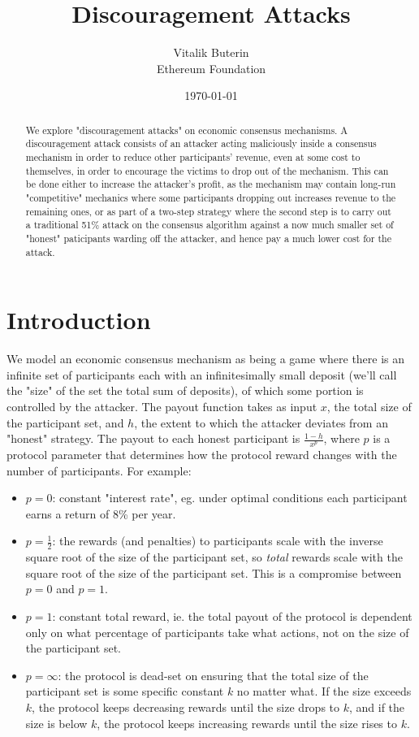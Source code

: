 \documentclass[12pt]{article}
\title{Discouragement Attacks}
\author{
        Vitalik Buterin \\
        Ethereum Foundation
}
\date{\today}
\begin{document}
\maketitle
\begin{abstract}
We explore "discouragement attacks" on economic consensus mechanisms. A discouragement attack consists of an attacker acting maliciously inside a consensus mechanism in order to reduce other participants' revenue, even at some cost to themselves, in order to encourage the victims to drop out of the mechanism. This can be done either to increase the attacker's profit, as the mechanism may contain long-run "competitive" mechanics where some participants dropping out increases revenue to the remaining ones, or as part of a two-step strategy where the second step is to carry out a traditional 51\% attack on the consensus algorithm against a now much smaller set of "honest" paticipants warding off the attacker, and hence pay a much lower cost for the attack.
\end{abstract}

\section{Introduction}
We model an economic consensus mechanism as being a game where there is an infinite set of participants each with an infinitesimally small deposit (we'll call the "size" of the set the total sum of deposits), of which some portion is controlled by the attacker. The payout function takes as input $x$, the total size of the participant set, and $h$, the extent to which the attacker deviates from an "honest" strategy. The payout to each honest participant is $\frac{1-h}{x^p}$, where $p$ is a protocol parameter that determines how the protocol reward changes with the number of participants. For example:

\begin{itemize}
\item $p=0$: constant "interest rate", eg. under optimal conditions each participant earns a return of 8\% per year.
\item $p=\frac{1}{2}$: the rewards (and penalties) to participants scale with the inverse square root of the size of the participant set, so \textit{total} rewards scale with the square root of the size of the participant set. This is a compromise between $p=0$ and $p=1$. \\
\item $p=1$: constant total reward, ie. the total payout of the protocol is dependent only on what percentage of participants take what actions, not on the size of the participant set. \\
\item $p=\infty$: the protocol is dead-set on ensuring that the total size of the participant set is some specific constant $k$ no matter what. If the size exceeds $k$, the protocol keeps decreasing rewards until the size drops to $k$, and if the size is below $k$, the protocol keeps increasing rewards until the size rises to $k$. \\
\end{itemize}
\end{document}
